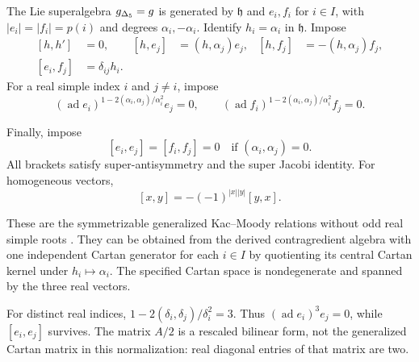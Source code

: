 \begin{definition}
\label{def:bkm-relations}
The Lie superalgebra ${g_{\Delta_5}}=g$ is generated by
$\mathfrak h$ and $e_i,f_i$ for $i\in I$, with
$|e_i|=|f_i|=p(i)$ and degrees $\alpha_i,-\alpha_i$.
Identify $h_i=\alpha_i$ in $\mathfrak h$. Impose
\begin{align}
\label{eq:bkm-cartan-relations}
 [h,h']&=0,&[h,e_j]&=(h,\alpha_j)e_j,&
 [h,f_j]&=-(h,\alpha_j)f_j,\\
\label{eq:bkm-chevalley-relations}
 [e_i,f_j]&=\delta_{ij}h_i.
\end{align}
For a real simple index $i$ and $j\ne i$, impose
\begin{equation}
\label{eq:bkm-real-serre}
 (\operatorname{ad}e_i)^{1-2(\alpha_i,\alpha_j)/\alpha_i^2}e_j=0,
 \qquad
 (\operatorname{ad}f_i)^{1-2(\alpha_i,\alpha_j)/\alpha_i^2}f_j=0.
\end{equation}

Finally, impose
\begin{equation}
\label{eq:bkm-orthogonality}
 [e_i,e_j]=[f_i,f_j]=0\quad\text{if }(\alpha_i,\alpha_j)=0.
\end{equation}
All brackets satisfy super-antisymmetry and the super Jacobi
identity. For homogeneous vectors,
\[
 [x,y]=-(-1)^{|x||y|}[y,x].
\]
\end{definition}

These are the symmetrizable generalized Kac--Moody relations without
odd real simple roots \cite[Statement~6.4 and equations~(6.26)--(6.30)]{GN}.
They can be obtained from the derived contragredient algebra with
one independent Cartan generator for each $i\in I$ by quotienting
its central Cartan kernel under $h_i\mapsto\alpha_i$.
The specified Cartan space is nondegenerate and spanned by the
three real vectors.

\begin{remark}
\label{rem:bkm-real-serre-exponent}
For distinct real indices, $1-2(\delta_i,\delta_j)/\delta_i^2=3$.
Thus $(\operatorname{ad}e_i)^3e_j=0$, while $[e_i,e_j]$ survives.
The matrix $A/2$ is a rescaled bilinear form, not the generalized
Cartan matrix in this normalization: real diagonal entries of that
matrix are two.
\end{remark}

